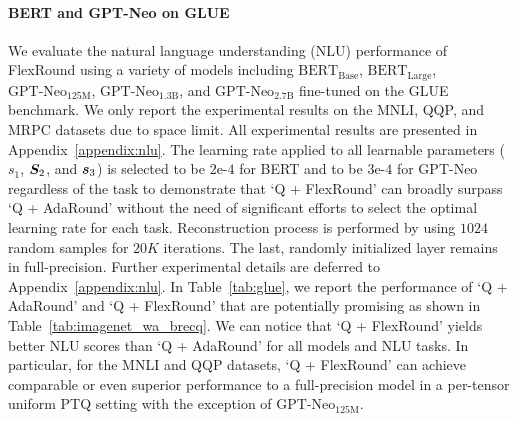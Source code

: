 \documentclass{article}
\theoremstyle{plain}
\theoremstyle{definition}
\theoremstyle{remark}
\begin{document}
\paragraph{BERT and GPT-Neo on GLUE} \label{subsec:nlu}
We evaluate the natural language understanding (NLU) performance of FlexRound using a variety of models including $\text{BERT}_{\text{Base}}$, $\text{BERT}_{\text{Large}}$, $\text{GPT-Neo}_{125\text{M}}$, $\text{GPT-Neo}_{1.3\text{B}}$, and $\text{GPT-Neo}_{2.7\text{B}}$ fine-tuned on the GLUE benchmark. 
We only report the experimental results on the MNLI, QQP, %
and MRPC datasets due to space limit. All experimental results are presented in Appendix~\ref{appendix:nlu}.
The learning rate applied to all learnable parameters ($s_1$, ${\bm{S}}_2$, and ${\bm{s}}_3$) is selected to be $2$e-$4$ for BERT and to be $3$e-$4$ for GPT-Neo regardless of the task to demonstrate that `Q + FlexRound' can broadly surpass `Q + AdaRound' without the need of significant efforts to select the optimal learning rate for each task. 
Reconstruction process is performed by using $1024$ random samples for $20K$ iterations. 
The last, randomly initialized layer remains in full-precision. Further experimental details are deferred to Appendix~\ref{appendix:nlu}. %
In Table~\ref{tab:glue}, we report the performance of `Q + AdaRound' and `Q + FlexRound' that are potentially promising as shown in Table~\ref{tab:imagenet_wa_brecq}.
We can notice that `Q + FlexRound' yields better NLU scores than `Q + AdaRound' for all %
models and NLU tasks.
In particular, for the MNLI and QQP datasets, `Q + FlexRound' can achieve comparable or even superior performance to a full-precision model in a per-tensor uniform PTQ setting with the exception of $\text{GPT-Neo}_{125\text{M}}$. 
\end{document}
